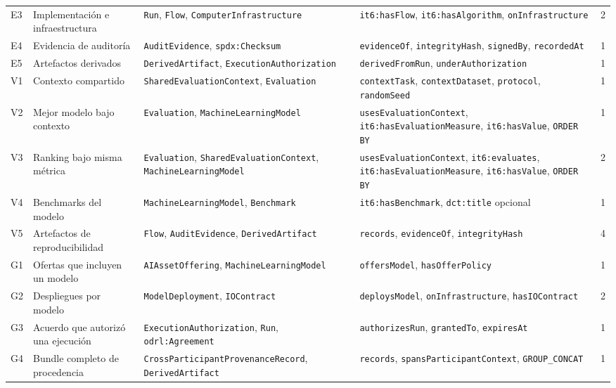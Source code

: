 \documentclass[Afour,sagev,times]{sagej}
\newcommand{\code}[1]{\texttt{#1}}
\begin{document}
\begin{table}[tb]
\begin{tabular}{@{}p{0.8cm}p{3.8cm}p{4.0cm}p{4.9cm}r@{}}
E3 & Implementación e infraestructura & \code{Run}, \code{Flow}, \code{ComputerInfrastructure} & \code{it6:hasFlow}, \code{it6:hasAlgorithm}, \code{onInfrastructure} & 2 \\
E4 & Evidencia de auditoría & \code{AuditEvidence}, \code{spdx:Checksum} & \code{evidenceOf}, \code{integrityHash}, \code{signedBy}, \code{recordedAt} & 1 \\
E5 & Artefactos derivados & \code{DerivedArtifact}, \code{ExecutionAuthorization} & \code{derivedFromRun}, \code{underAuthorization} & 1 \\
V1 & Contexto compartido & \code{SharedEvaluationContext}, \code{Evaluation} & \code{contextTask}, \code{contextDataset}, \code{protocol}, \code{randomSeed} & 1 \\
V2 & Mejor modelo bajo contexto & \code{Evaluation}, \code{MachineLearningModel} & \code{usesEvaluationContext}, \code{it6:hasEvaluationMeasure}, \code{it6:hasValue}, \code{ORDER BY} & 1 \\
V3 & Ranking bajo misma métrica & \code{Evaluation}, \code{SharedEvaluationContext}, \code{MachineLearningModel} & \code{usesEvaluationContext}, \code{it6:evaluates}, \code{it6:hasEvaluationMeasure}, \code{it6:hasValue}, \code{ORDER BY} & 2 \\
V4 & Benchmarks del modelo & \code{MachineLearningModel}, \code{Benchmark} & \code{it6:hasBenchmark}, \code{dct:title} opcional & 1 \\
V5 & Artefactos de reproducibilidad & \code{Flow}, \code{AuditEvidence}, \code{DerivedArtifact} & \code{records}, \code{evidenceOf}, \code{integrityHash} & 4 \\
G1 & Ofertas que incluyen un modelo & \code{AIAssetOffering}, \code{MachineLearningModel} & \code{offersModel}, \code{hasOfferPolicy} & 1 \\
G2 & Despliegues por modelo & \code{ModelDeployment}, \code{IOContract} & \code{deploysModel}, \code{onInfrastructure}, \code{hasIOContract} & 2 \\
G3 & Acuerdo que autorizó una ejecución & \code{ExecutionAuthorization}, \code{Run}, \code{odrl:Agreement} & \code{authorizesRun}, \code{grantedTo}, \code{expiresAt} & 1 \\
G4 & Bundle completo de procedencia & \code{CrossParticipant}\newline\code{ProvenanceRecord}, \code{DerivedArtifact} & \code{records}, \code{spansParticipantContext}, \code{GROUP\_CONCAT} & 1 \\
\bottomrule
\end{tabular}
\end{table}
\end{document}
